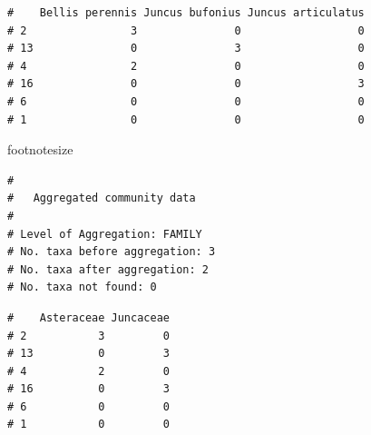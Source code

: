 \begin{sloppypar}
\begin{knitrout}\small
{}\color{fgcolor}\begin{kframe}
\begin{alltt}
  \hlstd{=} \hlstd{)}
 \hlkwb{<-} \hlstd{dune[ ,} \hlstd{(}\hlstd{,}\hlopt{:}\hlstd{)]}
 \hlkwb{<-} \hlstd{(}\hlstd{,} \hlstd{,}
                  \hlstd{)}
\end{alltt}
\begin{verbatim}
#    Bellis perennis Juncus bufonius Juncus articulatus
# 2                3               0                  0
# 13               0               3                  0
# 4                2               0                  0
# 16               0               0                  3
# 6                0               0                  0
# 1                0               0                  0
\end{verbatim}
\end{kframe}
\end{knitrout}


\begin{knitrout}footnotesize
\color{fgcolor}\begin{kframe}
\begin{alltt}
 \hlkwb{<-}   \hlstd{=} \hlstd{,}  \hlstd{=} \hlstd{)}
\end{alltt}
\begin{verbatim}
# 
# 	Aggregated community data
# 
# Level of Aggregation: FAMILY
# No. taxa before aggregation: 3
# No. taxa after aggregation: 2
# No. taxa not found: 0
\end{verbatim}
\end{kframe}
\end{knitrout}


\begin{knitrout}\small
{}\color{fgcolor}\begin{kframe}
\begin{alltt}
\hlopt{$}
\end{alltt}
\begin{verbatim}
#    Asteraceae Juncaceae
# 2           3         0
# 13          0         3
# 4           2         0
# 16          0         3
# 6           0         0
# 1           0         0
\end{verbatim}
\end{kframe}
\end{knitrout}


\end{sloppypar}
